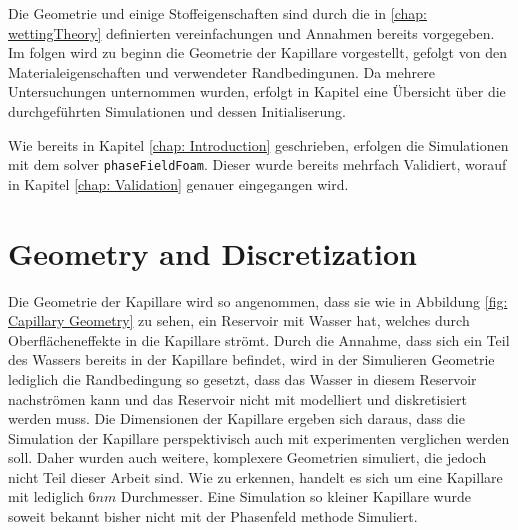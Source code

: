 Die Geometrie und einige Stoffeigenschaften sind durch die in \ref{chap: wettingTheory} definierten vereinfachungen und Annahmen bereits vorgegeben. Im folgen wird zu beginn die Geometrie der Kapillare vorgestellt, gefolgt von den Materialeigenschaften und verwendeter Randbedingunen. Da mehrere Untersuchungen unternommen wurden, erfolgt in Kapitel  eine Übersicht über die durchgeführten Simulationen und dessen Initialiserung. 


Wie bereits in Kapitel \ref{chap: Introduction} geschrieben, erfolgen die Simulationen mit dem solver \texttt{phaseFieldFoam}. Dieser wurde bereits mehrfach Validiert, worauf in Kapitel \ref{chap: Validation} genauer eingegangen wird. 

\section{Geometry and Discretization}
Die Geometrie der Kapillare wird so angenommen, dass sie wie in Abbildung \ref{fig: Capillary Geometry} zu sehen, ein Reservoir mit Wasser hat, welches durch Oberflächeneffekte in die Kapillare strömt. Durch die Annahme, dass sich ein Teil des Wassers bereits in der Kapillare befindet, wird in der Simulieren Geometrie lediglich die Randbedingung so gesetzt, dass das Wasser in diesem Reservoir nachströmen kann und das Reservoir nicht mit modelliert und diskretisiert werden muss. Die Dimensionen der Kapillare ergeben sich daraus, dass die Simulation der Kapillare perspektivisch auch mit experimenten verglichen werden soll. Daher wurden auch weitere, komplexere Geometrien simuliert, die jedoch nicht Teil dieser Arbeit sind. 
Wie zu erkennen, handelt es sich um eine Kapillare mit lediglich $6nm$ Durchmesser. Eine Simulation so kleiner Kapillare wurde soweit bekannt bisher nicht mit der Phasenfeld methode Simuliert.


